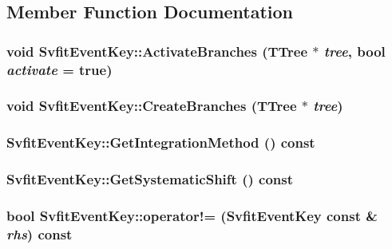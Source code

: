 \subsection{Member Function Documentation}
\hypertarget{classSvfitEventKey_aa6ef8de6f65a785ae34fdb7ffd8aa5b3}{
\subsubsection[{ActivateBranches}]{\setlength{\rightskip}{0pt plus 5cm}void SvfitEventKey::ActivateBranches (TTree $\ast$ {\em tree}, \/  bool {\em activate} = {\ttfamily true})}}
\label{classSvfitEventKey_aa6ef8de6f65a785ae34fdb7ffd8aa5b3}
\hypertarget{classSvfitEventKey_a29b6a06e4503052c4460277b9a97168d}{
\subsubsection[{CreateBranches}]{\setlength{\rightskip}{0pt plus 5cm}void SvfitEventKey::CreateBranches (TTree $\ast$ {\em tree})}}
\label{classSvfitEventKey_a29b6a06e4503052c4460277b9a97168d}
\hypertarget{classSvfitEventKey_ac7d1b2868f3d0e24b61af7406e085c04}{
\subsubsection[{GetIntegrationMethod}]{ SvfitEventKey::GetIntegrationMethod () const}}
\label{classSvfitEventKey_ac7d1b2868f3d0e24b61af7406e085c04}
\hypertarget{classSvfitEventKey_ab524322fe4600f72cc28a83fa5ce31b1}{
\subsubsection[{GetSystematicShift}]{ SvfitEventKey::GetSystematicShift () const}}
\label{classSvfitEventKey_ab524322fe4600f72cc28a83fa5ce31b1}
\hypertarget{classSvfitEventKey_a16bde69686be01e07c60db6fe5fc2df0}{
\subsubsection[{operator!=}]{\setlength{\rightskip}{0pt plus 5cm}bool SvfitEventKey::operator!= ({\bf SvfitEventKey} const \& {\em rhs}) const}}
